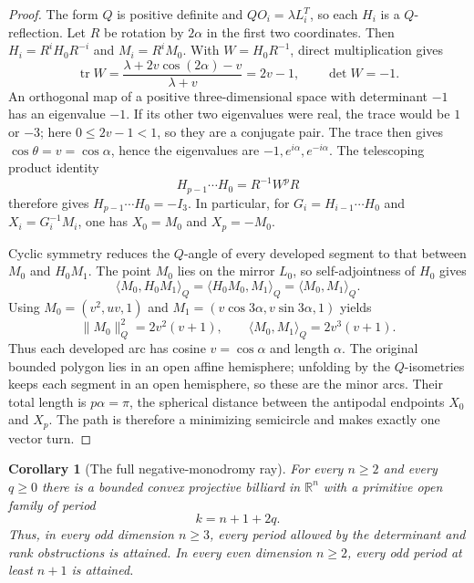 \documentclass[11pt,a4paper]{article}
\theoremstyle{plain}
\newtheorem{corollary}[theorem]{Corollary}
\theoremstyle{definition}
\theoremstyle{remark}
\begin{document}
\begin{proof}
The form $Q$ is positive definite and $QO_i=\lambda L_i^T$, so each $H_i$ is a
$Q$-reflection. Let $R$ be rotation by $2\alpha$ in the first two coordinates.
Then $H_i=R^iH_0R^{-i}$ and $M_i=R^iM_0$. With $W=H_0R^{-1}$, direct
multiplication gives
\[
 \operatorname{tr}W=\frac{\lambda+2v\cos(2\alpha)-v}{\lambda+v}=2v-1,
 \qquad \det W=-1.
\]
An orthogonal map of a positive three-dimensional space with determinant $-1$
has an eigenvalue $-1$. If its other two eigenvalues were real, the trace would be
$1$ or $-3$; here $0\le 2v-1<1$, so they are a conjugate pair. The trace then
gives $\cos\theta=v=\cos\alpha$, hence the eigenvalues are
$-1,e^{i\alpha},e^{-i\alpha}$. The telescoping product identity
\[
 H_{p-1}\cdots H_0=R^{-1}W^pR
\]
therefore gives $H_{p-1}\cdots H_0=-I_3$. In particular, for
$G_i=H_{i-1}\cdots H_0$ and $X_i=G_i^{-1}M_i$, one has $X_0=M_0$ and
$X_p=-M_0$.

Cyclic symmetry reduces the $Q$-angle of every developed segment to that between
$M_0$ and $H_0M_1$. The point $M_0$ lies on the mirror $L_0$, so self-adjointness
of $H_0$ gives
\[
 \langle M_0,H_0M_1\rangle_Q
 =\langle H_0M_0,M_1\rangle_Q
 =\langle M_0,M_1\rangle_Q.
\]
Using $M_0=(v^2,uv,1)$ and $M_1=(v\cos3\alpha,v\sin3\alpha,1)$ yields
\[
 \|M_0\|_Q^2=2v^2(v+1),\qquad
 \langle M_0,M_1\rangle_Q=2v^3(v+1).
\]
Thus each developed arc has cosine $v=\cos\alpha$ and length $\alpha$. The
original bounded polygon lies in an open affine hemisphere; unfolding by the
$Q$-isometries keeps each segment in an open hemisphere, so these are the minor
arcs. Their total length is $p\alpha=\pi$, the spherical distance between the
antipodal endpoints $X_0$ and $X_p$. The path is therefore a minimizing
semicircle and makes exactly one vector turn.
\end{proof}



\begin{corollary}[The full negative-monodromy ray]
\label{cor:join-full-negative-ray}
For every $n\ge2$ and every $q\ge0$ there is a bounded convex
projective billiard in $\mathbb R^n$ with a primitive open family of period
\begin{equation}\label{eq:full-negative-ray}
                         k=n+1+2q.
\end{equation}
Thus, in every odd dimension $n\ge3$, every period allowed by the determinant
and rank obstructions is attained.  In every even dimension $n\ge2$, every odd
period at least $n+1$ is attained.
\end{corollary}
\end{document}
